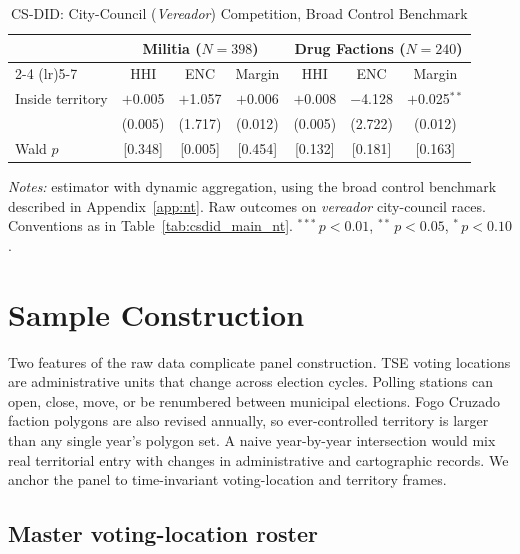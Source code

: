 \documentclass[11pt]{article}
\newcommand{\tabnotes}[1]{\par\vspace{3pt}\noindent\begin{minipage}{\linewidth}\footnotesize #1\end{minipage}}
\begin{document}
\begin{table}[H]
\centering
\caption{CS-DID: City-Council (\emph{Vereador}) Competition, Broad Control Benchmark}\label{tab:csdid_vereador_nt}
\footnotesize
\begin{tabular}{@{}l ccc ccc@{}}
\toprule
 & \multicolumn{3}{c}{\textbf{Militia} ($N = 398$)} & \multicolumn{3}{c}{\textbf{Drug Factions} ($N = 240$)} \\
\cmidrule(lr){2-4} \cmidrule(lr){5-7}
 & HHI & ENC & Margin & HHI & ENC & Margin \\
\midrule
Inside territory & $+$0.005 & $+$1.057 & $+$0.006 & $+$0.008 & $-$4.128 & $+$0.025$^{**}$ \\
                 & (0.005)  & (1.717)  & (0.012)  & (0.005)  & (2.722)  & (0.012)  \\
Wald $p$         & [0.348]  & [0.005]  & [0.454]  & [0.132]  & [0.181]  & [0.163]  \\
\bottomrule
\end{tabular}
\tabnotes{\textit{Notes:} \citet{callaway2021did} estimator with dynamic aggregation, using the broad control benchmark described in Appendix~\ref{app:nt}. Raw outcomes on \emph{vereador} city-council races. Conventions as in Table~\ref{tab:csdid_main_nt}. $^{***}\,p<0.01$, $^{**}\,p<0.05$, $^{*}\,p<0.10$.}
\end{table}

\section{Sample Construction}\label{app:sample}

Two features of the raw data complicate panel construction. TSE voting locations are administrative units that change across election cycles. Polling stations can open, close, move, or be renumbered between municipal elections. Fogo Cruzado faction polygons are also revised annually, so ever-controlled territory is larger than any single year's polygon set. A naive year-by-year intersection would mix real territorial entry with changes in administrative and cartographic records. We anchor the panel to time-invariant voting-location and territory frames.

\subsection{Master voting-location roster}
\end{document}
